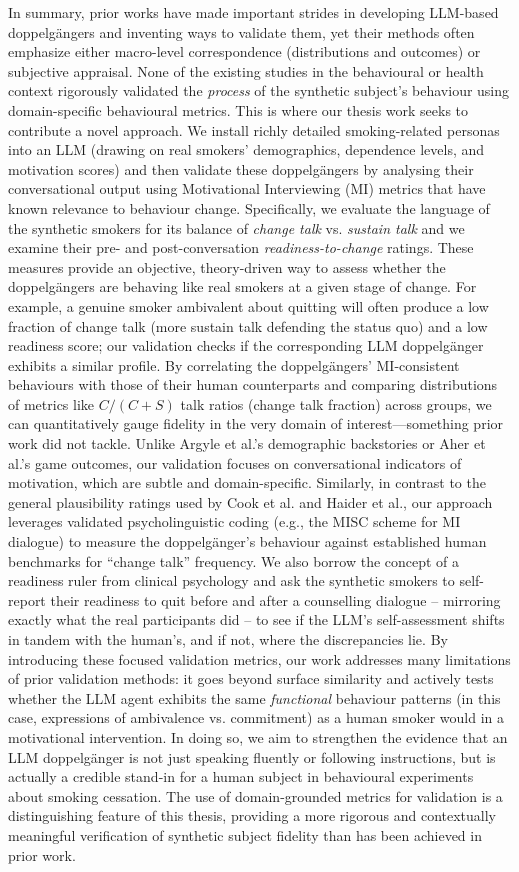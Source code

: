 In summary, prior works have made important strides in developing LLM-based doppelgängers and inventing ways to validate them, yet their methods often emphasize either macro-level correspondence (distributions and outcomes) or subjective appraisal. None of the existing studies in the behavioural or health context rigorously validated the \emph{process} of the synthetic subject’s behaviour using domain-specific behavioural metrics. This is where our thesis work seeks to contribute a novel approach. We install richly detailed smoking-related personas into an LLM (drawing on real smokers’ demographics, dependence levels, and motivation scores) and then validate these doppelgängers by analysing their conversational output using Motivational Interviewing (MI) metrics that have known relevance to behaviour change. Specifically, we evaluate the language of the synthetic smokers for its balance of \emph{change talk} vs. \emph{sustain talk} and we examine their pre- and post-conversation \emph{readiness-to-change} ratings. These measures provide an objective, theory-driven way to assess whether the doppelgängers are behaving like real smokers at a given stage of change. For example, a genuine smoker ambivalent about quitting will often produce a low fraction of change talk (more sustain talk defending the status quo) and a low readiness score; our validation checks if the corresponding LLM doppelgänger exhibits a similar profile. By correlating the doppelgängers’ MI-consistent behaviours with those of their human counterparts and comparing distributions of metrics like $C/(C+S)$ talk ratios (change talk fraction) across groups, we can quantitatively gauge fidelity in the very domain of interest---something prior work did not tackle. Unlike Argyle et al.’s demographic backstories or Aher et al.’s game outcomes, our validation focuses on conversational indicators of motivation, which are subtle and domain-specific. Similarly, in contrast to the general plausibility ratings used by Cook et al. and Haider et al., our approach leverages validated psycholinguistic coding (e.g., the MISC scheme for MI dialogue) to measure the doppelgänger’s behaviour against established human benchmarks for “change talk” frequency. We also borrow the concept of a readiness ruler from clinical psychology and ask the synthetic smokers to self-report their readiness to quit before and after a counselling dialogue – mirroring exactly what the real participants did – to see if the LLM’s self-assessment shifts in tandem with the human’s, and if not, where the discrepancies lie. By introducing these focused validation metrics, our work addresses many limitations of prior validation methods: it goes beyond surface similarity and actively tests whether the LLM agent exhibits the same \emph{functional} behaviour patterns (in this case, expressions of ambivalence vs. commitment) as a human smoker would in a motivational intervention. In doing so, we aim to strengthen the evidence that an LLM doppelgänger is not just speaking fluently or following instructions, but is actually a credible stand-in for a human subject in behavioural experiments about smoking cessation. The use of domain-grounded metrics for validation is a distinguishing feature of this thesis, providing a more rigorous and contextually meaningful verification of synthetic subject fidelity than has been achieved in prior work.
